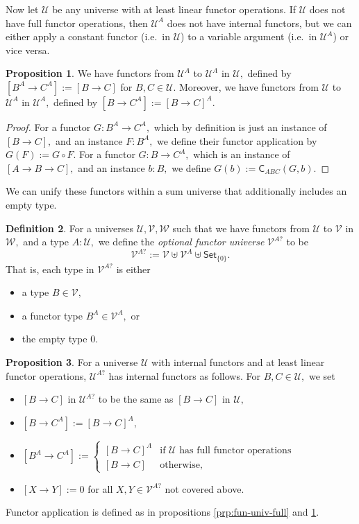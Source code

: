 \documentclass[a4paper]{article}
\theoremstyle{definition}
\newtheorem{definition}{Definition}[section]
\newtheorem{proposition}[definition]{Proposition}
\theoremstyle{remark}
\newcommand{\defn}{\emph}
\newcommand{\U}{\mathcal{U}}
\newcommand{\V}{\mathcal{V}}
\newcommand{\W}{\mathcal{W}}
\newcommand{\nm}{\mathsf}
\newcommand{\universe}{\nm}
\newcommand{\Set}{\universe{Set}}
\newcommand{\combinator}{\nm}
\newcommand{\swapFun}{\combinator{C}}
\begin{document}
Now let $\U$ be any universe with at least linear functor operations. If $\U$ does
not have full functor operations, then $\U^A$ does not have internal functors, but
we can either apply a constant functor (i.e.\ in $\U$) to a variable argument
(i.e.\ in $\U^A$) or vice versa.

\begin{proposition}
  \label{prp:fun-univ-linear}
  We have functors from $\U^A$ to $\U^A$ in $\U,$ defined by $[B^A \to C^A] := [B \to C]$
  for $B,C \in \U.$ Moreover, we have functors from $\U$ to $\U^A$ in $\U^A,$
  defined by $[B \to C^A] := [B \to C]^A.$
\end{proposition}
\vspace{-1ex}
\begin{proof}
  For a functor $G : B^A \to C^A,$ which by definition is just an instance of
  $[B \to C],$ and an instance $F : B^A,$ we define their functor application by
  $G(F) := G \circ F.$ For a functor $G : B \to C^A,$ which is an instance of
  $[A \to B \to C],$ and an instance $b : B,$ we define
  $G(b) := \swapFun_{ABC}(G,b).$
\end{proof}

We can unify these functors within a sum universe that additionally includes an
empty type.

\begin{definition}
  For a universes $\U,\V,\W$ such that we have functors from $\U$ to $\V$ in $\W,$
  and a type $A : \U,$ we define the \defn{optional functor universe} $\V^{A?}$ to
  be
  \[\V^{A?} := \V \uplus \V^A \uplus \Set_{\{0\}}.\]
  That is, each type in $\V^{A?}$ is either
  \begin{itemize}
    \item a type $B \in \V,$
    \item a functor type $B^A \in \V^A,$ or
    \item the empty type $0.$
  \end{itemize}
\end{definition}

\begin{proposition}
  For a universe $\U$ with internal functors and at least linear functor operations,
  $\U^{A?}$ has internal functors as follows. For $B,C \in \U,$ we set
  \begin{itemize}
    \item $[B \to C]$ in $\U^{A?}$ to be the same as $[B \to C]$ in $\U,$
    \item $[B \to C^A] := [B \to C]^A,$
    \item $[B^A \to C^A] := \begin{cases}
      [B \to C]^A & \text{if $\U$ has full functor operations}\\
      [B \to C]   & \text{otherwise,}
    \end{cases}$
    \item $[X \to Y] := 0$ for all $X,Y \in \V^{A?}$ not covered above.
  \end{itemize}
  Functor application is defined as in propositions \ref{prp:fun-univ-full} and
  \ref{prp:fun-univ-linear}.
\end{proposition}
\end{document}
